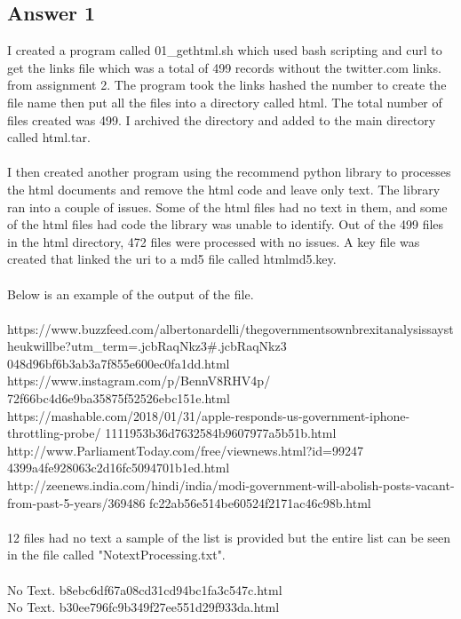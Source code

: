 \documentclass[10pt,letterpaper]{article}
\begin{document}
\subsection{Answer 1}
I created a program called 01\_gethtml.sh which used bash scripting and curl to get the links file which was a total of 499 records without the twitter.com links. from assignment 2.  The program took the links hashed the number to create the file name then put all the files into a directory called html.  The total number of files created was 499.  I archived the directory and added to the main directory called html.tar.\\
\\
I then created another program using the recommend python library to processes the html documents and remove the html code and leave only text.  The library ran into a couple of issues.  Some of the html files had no text in them, and some of the html files had code the library was unable to identify.  Out of the 499 files in the html directory, 472 files were processed with no issues.  A key file was created that linked the uri to a md5 file called htmlmd5.key.\\
\\
Below is an example of the output of the file.\\
\\
https://www.buzzfeed.com/albertonardelli/the\-governments\-own\-brexit\-analysis\-says\-the\-uk\-will\-be?utm\_term=.jcbRaqNkz3\#.jcbRaqNkz3   	 048d96bf6b3ab3a7f855e600ec0fa1dd.html\\
https://www.instagram.com/p/BennV8RHV4p/ 	 72f66bc4d6e9ba35875f52526ebc151e.html\\
https://mashable.com/2018/01/31/apple-responds-us-government-iphone-throttling-probe/ 	 1111953b36d7632584b9607977a5b51b.html\\
http://www.ParliamentToday.com/free/viewnews.html?id=99247 	 4399a4fe928063c2d16fc5094701b1ed.html\\
http://zeenews.india.com/hindi/india/modi-government-will-abolish-posts-vacant-from-past-5-years/369486 	 fc22ab56e514be60524f2171ac46c98b.html\\
\\
12 files had no text a sample of the list is provided but the entire list can be seen in the file called "NotextProcessing.txt".\\  
\\
No Text. b8ebc6df67a08cd31cd94bc1fa3c547c.html\\
No Text. b30ee796fc9b349f27ee551d29f933da.html\\
\end{document}
